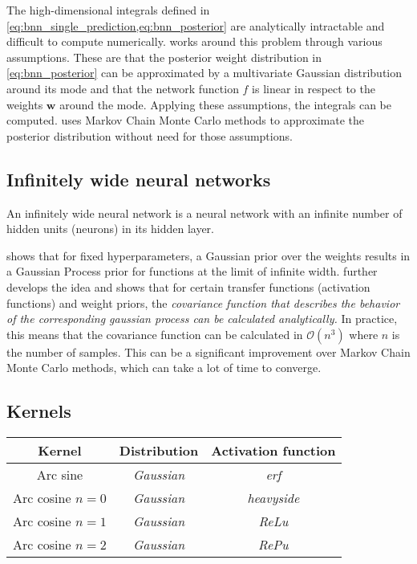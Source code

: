 
The high-dimensional integrals defined in \cref{eq:bnn_single_prediction,eq:bnn_posterior} are analytically intractable and
difficult to compute numerically. \Textcite{mackayBayesianMethodsAdaptive1999} works around this problem through various assumptions.
These are that the posterior weight distribution in \cref{eq:bnn_posterior} can be approximated by a multivariate Gaussian distribution around its mode
and that the network function $f$ is linear in respect to the weights $\textbf{w}$ around the mode. Applying these assumptions, the integrals
can be computed. \Textcite{nealBayesianTrainingBackpropagation1992} uses Markov Chain Monte Carlo methods to approximate the posterior distribution without
need for those assumptions.

\subsection{Infinitely wide neural networks}%
\label{sub:infinitely_wide_neural_networks}

An infinitely wide neural network is a neural network with an infinite number of hidden units (neurons) in its hidden layer.

\Textcite{nealBayesianLearningNeural1996} shows that for fixed hyperparameters, a Gaussian prior over the weights
results in a Gaussian Process prior for functions at the limit of infinite width.
\Textcite{williamsComputationInfiniteNeural1998} further develops the idea and shows that for
certain transfer functions (activation functions) and weight priors, the
\emph{covariance function that describes the behavior of the
corresponding gaussian process can be calculated analytically.} In practice,
this means that the covariance function can be calculated in $\mathcal{O}(n^3)$ where
$n$ is the number of samples. This can be a significant improvement over Markov Chain Monte
Carlo methods, which can take a lot of time to converge.

\Textcite{bishopChapterSinglelayerNetworks1995}

\subsection{Kernels}
\label{sub:kernels}

\begin{table}[H]
    \begin{tabular}{ccc}
        \toprule
        \textbf{Kernel} & \textbf{Distribution} & \textbf{Activation function} \\
        \midrule
        Arc sine & \textit{Gaussian} & \textit{erf} \\
        Arc cosine $n=0$ & \textit{Gaussian} & \textit{heavyside} \\
        Arc cosine $n=1$ & \textit{Gaussian} & \textit{ReLu} \\
        Arc cosine $n=2$ & \textit{Gaussian} & \textit{RePu} \\
        \bottomrule
    \end{tabular}
\end{table}

